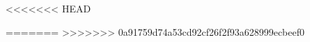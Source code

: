 \documentclass[12pt]{article}
\begin{document}









<<<<<<< HEAD

=======
>>>>>>> 0a91759d74a53cd92cf26f2f93a628999ecbeef0
\end{document}
